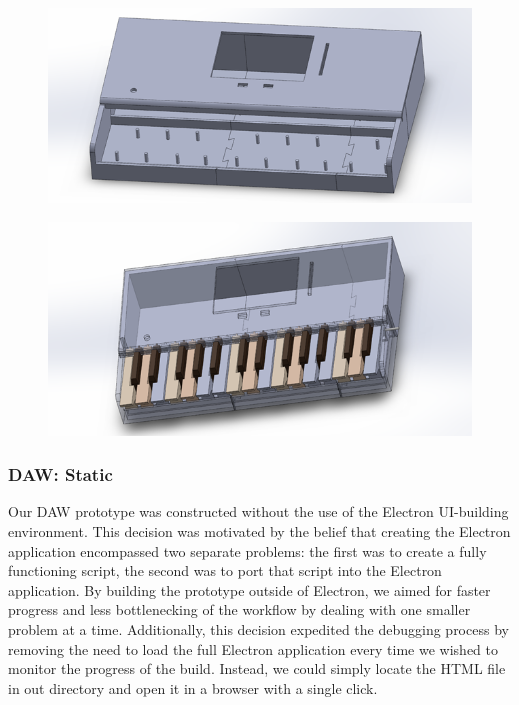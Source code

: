 \begin{figure}[h!]
  \centering
  \includegraphics[width=0.8\linewidth]{image/FinalModel1.png}
  \caption{}
  \label{fig:final_model1}
\end{figure}

\begin{figure}[h!]
  \centering
  \includegraphics[width=0.8\linewidth]{image/FinalModel2.png}
  \caption{}
  \label{fig:final_model2}
\end{figure}

\subsubsection{DAW: Static}

Our DAW prototype was constructed without the use of the Electron UI-building environment. This
decision was motivated by the belief that creating the Electron application encompassed two
separate problems: the first was to create a fully functioning script, the second was to port that
script into the Electron application. By building the prototype outside of Electron, we aimed for
faster progress and less bottlenecking of the workflow by dealing with one smaller problem at a
time. Additionally, this decision expedited the debugging process by removing the need to load
the full Electron application every time we wished to monitor the progress of the build. Instead,
we could simply locate the HTML file in out directory and open it in a browser with a single click.

